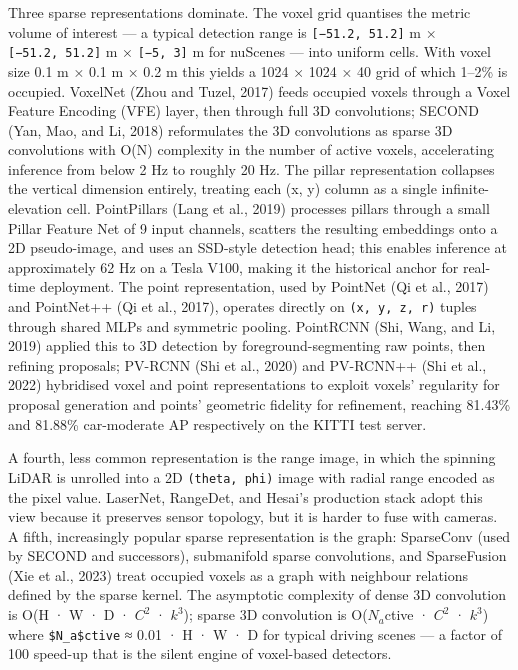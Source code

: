 Three sparse representations dominate. The voxel grid quantises the metric volume of interest --- a typical detection range is \texttt{{[}−51.2,\ 51.2{]}} m × \texttt{{[}−51.2,\ 51.2{]}} m × \texttt{{[}−5,\ 3{]}} m for nuScenes --- into uniform cells. With voxel size 0.1 m × 0.1 m × 0.2 m this yields a 1024 × 1024 × 40 grid of which 1--2\% is occupied. VoxelNet (Zhou and Tuzel, 2017) feeds occupied voxels through a Voxel Feature Encoding (VFE) layer, then through full 3D convolutions; SECOND (Yan, Mao, and Li, 2018) reformulates the 3D convolutions as sparse 3D convolutions with O(N) complexity in the number of active voxels, accelerating inference from below 2 Hz to roughly 20 Hz. The pillar representation collapses the vertical dimension entirely, treating each (x, y) column as a single infinite-elevation cell. PointPillars (Lang et al., 2019) processes pillars through a small Pillar Feature Net of 9 input channels, scatters the resulting embeddings onto a 2D pseudo-image, and uses an SSD-style detection head; this enables inference at approximately 62 Hz on a Tesla V100, making it the historical anchor for real-time deployment. The point representation, used by PointNet (Qi et al., 2017) and PointNet++ (Qi et al., 2017), operates directly on \texttt{(x,\ y,\ z,\ r)} tuples through shared MLPs and symmetric pooling. PointRCNN (Shi, Wang, and Li, 2019) applied this to 3D detection by foreground-segmenting raw points, then refining proposals; PV-RCNN (Shi et al., 2020) and PV-RCNN++ (Shi et al., 2022) hybridised voxel and point representations to exploit voxels' regularity for proposal generation and points' geometric fidelity for refinement, reaching 81.43\% and 81.88\% car-moderate AP respectively on the KITTI test server.

A fourth, less common representation is the range image, in which the spinning LiDAR is unrolled into a 2D \texttt{(theta,\ phi)} image with radial range encoded as the pixel value. LaserNet, RangeDet, and Hesai's production stack adopt this view because it preserves sensor topology, but it is harder to fuse with cameras. A fifth, increasingly popular sparse representation is the graph: SparseConv (used by SECOND and successors), submanifold sparse convolutions, and SparseFusion (Xie et al., 2023) treat occupied voxels as a graph with neighbour relations defined by the sparse kernel. The asymptotic complexity of dense 3D convolution is O(H · W · D · \(C^2\) · \(k^3\)); sparse 3D convolution is O(\(N_a\)ctive · \(C^2\) · \(k^3\)) where \texttt{\$N\_a\$ctive} ≈ 0.01 · H · W · D for typical driving scenes --- a factor of 100 speed-up that is the silent engine of voxel-based detectors.

